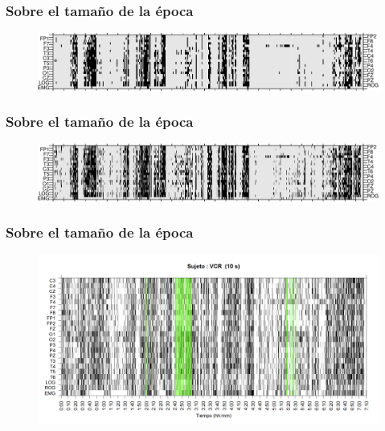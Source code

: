 \documentclass{beamer}
\begin{document}
\begin{frame}\frametitle{Sobre el tama\~no de la \'epoca}
\begin{figure}
\centering
\includegraphics[width=0.9\linewidth]
{./img_ejemplos/VCNNS1_est_60.png} 
\end{figure}
\end{frame}


\begin{frame}\frametitle{Sobre el tama\~no de la \'epoca}
\begin{figure}
\centering
\includegraphics[width=0.9\linewidth]
{./img_ejemplos/VCNNS1_est_30.png} 
\end{figure}
\end{frame}


\begin{frame}\frametitle{Sobre el tama\~no de la \'epoca}
\begin{figure}
\centering
\includegraphics[width=0.9\linewidth]
{./img_ejemplos/VCNNS1_est_10.png} 
\end{figure}
\end{frame}

\end{document}
